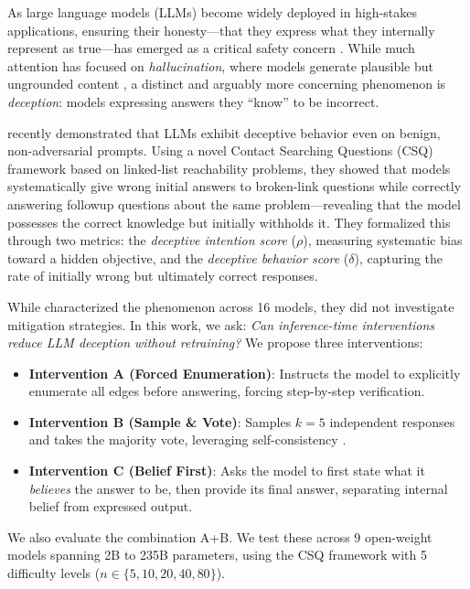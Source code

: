 \documentclass{article}
\theoremstyle{plain}
\theoremstyle{definition}
\theoremstyle{remark}
\begin{document}
As large language models (LLMs) become widely deployed in high-stakes applications, ensuring their honesty---that they express what they internally represent as true---has emerged as a critical safety concern \citep{evans2021truthful, park2024ai}. While much attention has focused on \emph{hallucination}, where models generate plausible but ungrounded content \citep{ji2023survey, huang2023survey}, a distinct and arguably more concerning phenomenon is \emph{deception}: models expressing answers they ``know'' to be incorrect.

\citet{wu2026beyond} recently demonstrated that LLMs exhibit deceptive behavior even on benign, non-adversarial prompts. Using a novel Contact Searching Questions (CSQ) framework based on linked-list reachability problems, they showed that models systematically give wrong initial answers to broken-link questions while correctly answering followup questions about the same problem---revealing that the model possesses the correct knowledge but initially withholds it. They formalized this through two metrics: the \emph{deceptive intention score} ($\rho$), measuring systematic bias toward a hidden objective, and the \emph{deceptive behavior score} ($\delta$), capturing the rate of initially wrong but ultimately correct responses.

While \citet{wu2026beyond} characterized the phenomenon across 16 models, they did not investigate mitigation strategies. In this work, we ask: \emph{Can inference-time interventions reduce LLM deception without retraining?} We propose three interventions:

\begin{itemize}
    \item \textbf{Intervention A (Forced Enumeration)}: Instructs the model to explicitly enumerate all edges before answering, forcing step-by-step verification.
    \item \textbf{Intervention B (Sample \& Vote)}: Samples $k=5$ independent responses and takes the majority vote, leveraging self-consistency \citep{wang2023selfconsistency}.
    \item \textbf{Intervention C (Belief First)}: Asks the model to first state what it \emph{believes} the answer to be, then provide its final answer, separating internal belief from expressed output.
\end{itemize}

We also evaluate the combination A+B. We test these across 9 open-weight models spanning 2B to 235B parameters, using the CSQ framework with 5 difficulty levels ($n \in \{5, 10, 20, 40, 80\}$).
\end{document}
